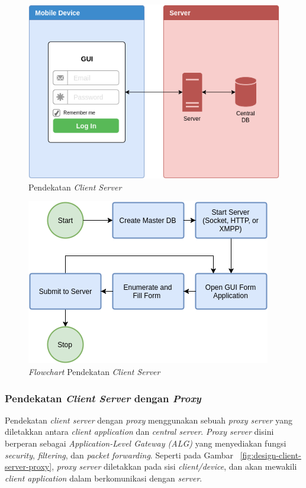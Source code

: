 \begin{figure}[h]
    \centering
    \includegraphics[width=.7\textwidth]{../../Resources/Images/design-client-server}
    \caption{Pendekatan \textit{Client Server}}
    \label{fig:design-client-server}
\end{figure}

\begin{figure}[h]
    \centering
    \includegraphics[width=.7\textwidth]{../../Resources/Images/design-client-server-flowchart}
    \caption{\textit{Flowchart} Pendekatan \textit{Client Server}}
    \label{fig:design-client-server-flowchart}
\end{figure}


\subsubsection{Pendekatan \textit{Client Server} dengan \textit{Proxy}} \label{sssec:client-server-proxy}

Pendekatan \textit{client server} dengan \textit{proxy} menggunakan sebuah \textit{proxy server} yang diletakkan antara \textit{client application} dan \textit{central server}. \textit{Proxy server} disini berperan sebagai \textit{Application-Level Gateway (ALG)} yang menyediakan fungsi \textit{security}, \textit{filtering}, dan \textit{packet forwarding}. Seperti pada Gambar ~\ref{fig:design-client-server-proxy}, \textit{proxy server} diletakkan pada sisi \textit{client/device}, dan akan mewakili \textit{client application} dalam berkomunikasi dengan \textit{server}.


